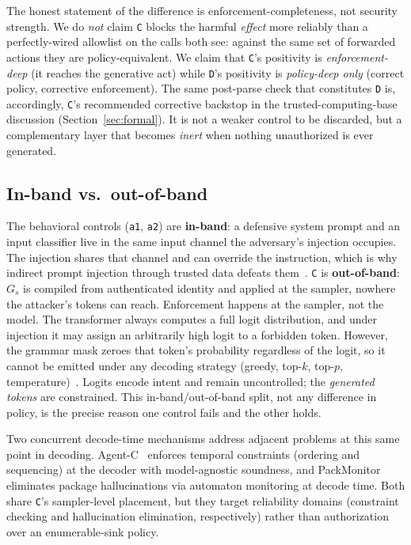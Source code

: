 The honest statement of the difference is enforcement-completeness, not security strength. We do \emph{not} claim \texttt{C} blocks the harmful \emph{effect} more reliably than a perfectly-wired allowlist on the calls both see: against the same set of forwarded actions they are policy-equivalent. We claim that \texttt{C}'s positivity is \emph{enforcement-deep} (it reaches the generative act) while \texttt{D}'s positivity is \emph{policy-deep only} (correct policy, corrective enforcement). The same post-parse check that constitutes \texttt{D} is, accordingly, \texttt{C}'s recommended corrective backstop in the trusted-computing-base discussion (Section~\ref{sec:formal}). It is not a weaker control to be discarded, but a complementary layer that becomes \emph{inert} when nothing unauthorized is ever generated.

\subsection{In-band vs.\ out-of-band}
\label{sec:core:band}

The behavioral controls (\texttt{a1}, \texttt{a2}) are \textbf{in-band}: a defensive system prompt and an input classifier live in the same input channel the adversary's injection occupies. The injection shares that channel and can override the instruction, which is why indirect prompt injection through trusted data defeats them~\cite{greshake2023}. \texttt{C} is \textbf{out-of-band}: \(G_s\) is compiled from authenticated identity and applied at the sampler, nowhere the attacker's tokens can reach. Enforcement happens at the sampler, not the model. The transformer always computes a full logit distribution, and under injection it may assign an arbitrarily high logit to a forbidden token. However, the grammar mask zeroes that token's probability regardless of the logit, so it cannot be emitted under any decoding strategy (greedy, top-\(k\), top-\(p\), temperature)~\cite{willard2023,dong2024xgrammar}. Logits encode intent and remain uncontrolled; the \emph{generated tokens} are constrained. This in-band/out-of-band split, not any difference in policy, is the precise reason one control fails and the other holds.

Two concurrent decode-time mechanisms address adjacent problems at this same point in decoding. Agent-C~\cite{agentc2025} enforces temporal constraints (ordering and sequencing) at the decoder with model-agnostic soundness, and PackMonitor~\cite{packmonitor2026} eliminates package hallucinations via automaton monitoring at decode time. Both share \texttt{C}'s sampler-level placement, but they target reliability domains (constraint checking and hallucination elimination, respectively) rather than authorization over an enumerable-sink policy.

